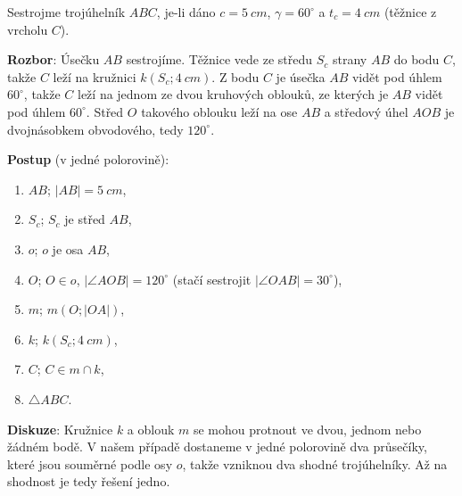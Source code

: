 \begin{example}
  Sestrojme trojúhelník $ABC$, je-li dáno $c = 5\ \si{cm}$, $\gamma = 60^\circ$ a $t_c = 4\ \si{cm}$ (těžnice z vrcholu $C$).

  \textbf{Rozbor}: Úsečku $AB$ sestrojíme. Těžnice vede ze středu $S_c$ strany $AB$ do bodu $C$, takže $C$ leží na kružnici $k(S_c; 4\ \si{cm})$. Z bodu $C$ je úsečka $AB$ vidět pod úhlem $60^\circ$, takže $C$ leží na jednom ze dvou kruhových oblouků, ze kterých je $AB$ vidět pod úhlem $60^\circ$. Střed $O$ takového oblouku leží na ose $AB$ a středový úhel $AOB$ je dvojnásobkem obvodového, tedy $120^\circ$.

  \textbf{Postup} (v jedné polorovině):
  \begin{enumerate}
    \item $AB$; $|AB| = 5\ \si{cm}$,
    \item $S_c$; $S_c$ je střed $AB$,
    \item $o$; $o$ je osa $AB$,
    \item $O$; $O\in o$, $|\angle AOB| = 120^\circ$ (stačí sestrojit $|\angle OAB| = 30^\circ$),
    \item $m$; $m(O; |OA|)$,
    \item $k$; $k(S_c; 4\ \si{cm})$,
    \item $C$; $C\in m\cap k$,
    \item $\triangle ABC$.
  \end{enumerate}
  \textbf{Diskuze}: Kružnice $k$ a oblouk $m$ se mohou protnout ve dvou, jednom nebo žádném bodě. V našem případě dostaneme v jedné polorovině dva průsečíky, které jsou souměrné podle osy $o$, takže vzniknou dva shodné trojúhelníky. Až na shodnost je tedy řešení jedno.
  \begin{center}
  \end{center}
\end{example}

